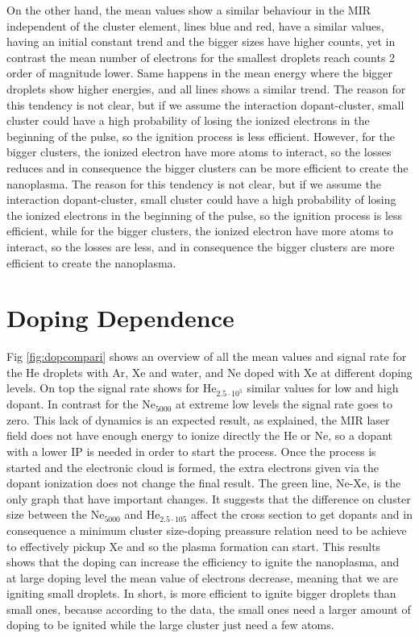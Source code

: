On the other hand, the mean values show a similar behaviour in the MIR independent of the cluster element, lines blue and red, have a similar values, having an initial constant trend and the bigger sizes have higher counts, yet in contrast the mean number of electrons  for the smallest droplets reach counts 2 order of magnitude lower. Same happens in the mean energy where the bigger droplets show higher energies, and all lines shows a similar trend. 
The reason for this tendency is not clear, but if we assume the interaction dopant-cluster, small cluster could have a high probability of losing the ionized electrons in the beginning of the pulse, so the ignition process is less efficient. However, for the bigger clusters, the ionized electron have more atoms to interact, so the losses reduces and in consequence the bigger clusters can be more efficient to create the nanoplasma. The reason for this tendency is not clear, but if we assume the interaction dopant-cluster, small cluster could have a high probability of losing the ionized electrons in the beginning of the pulse, so the ignition process is less efficient, while for the bigger clusters, the ionized electron have more atoms to interact, so the losses are less, and in consequence the bigger clusters are more efficient to create the nanoplasma.




\section{Doping Dependence}

Fig \ref{fig:dopcompari} shows an overview of all the mean values and signal rate for the He droplets with Ar, Xe and water, and Ne doped with Xe at different doping levels. On top the signal rate shows for He$_{2.5\cdot 10^{5}}$ similar values for low and high dopant. In contrast for the Ne$_{5000}$ at extreme low levels the signal rate goes to zero.  This lack of dynamics is an expected result, as explained, the MIR laser field does not have enough energy to ionize directly the He or Ne, so a dopant with a lower IP is needed in order to start the process. Once the process is started and the electronic cloud is formed, the extra  electrons given via the dopant ionization does not change the final result. The green line, Ne-Xe, is the only graph that have important changes. It suggests that the difference on cluster size between the Ne$_{5000}$ and He$_{2.5\cdot 10{5}}$ affect the cross section to get dopants and in consequence a minimum cluster size-doping preassure relation need to be achieve to effectively pickup Xe and so the plasma formation can start. This results shows that the doping can increase the efficiency to ignite the nanoplasma, and at large doping level the mean value of electrons decrease, meaning that we are igniting small droplets. In short, is more efficient to ignite bigger droplets than small ones, because according to the data, the small ones need a larger amount of doping to be ignited while the large cluster just need a few atoms.

